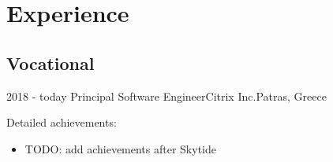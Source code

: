 \documentclass[10pt,a4paper]{moderncv}        %
\begin{document}
\makecvtitle

\section{Experience}

\subsection{Vocational}

\cventry
{2018 - today}
{Principal Software Engineer}{Citrix Inc.}{Patras, Greece}{}
 {%
Detailed achievements:%
\begin{itemize}
  \item
TODO: add achievements after Skytide
\end{itemize}}
\end{document}
